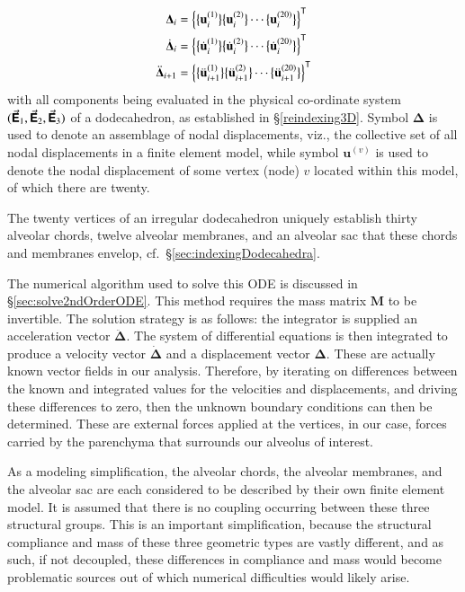\begin{subequations}
\begin{align}
    \boldsymbol{\Delta}_i & = \Bigl\{ 
    \bigl\{ \mathbf{u}^{(1)}_i \bigr\} 
    \bigl\{ \mathbf{u}^{(2)}_i \bigr\} 
    \cdots
    \bigl\{ \mathbf{u}^{(20)}_i \bigr\}
    \Bigr\}^{\mathsf{T}} \\
    \dot{\boldsymbol{\Delta}}_i & = \Bigl\{ 
    \bigl\{ \dot{\mathbf{u}}^{(1)}_i \bigr\} 
    \bigl\{ \dot{\mathbf{u}}^{(2)}_i \bigr\} 
    \cdots
    \bigl\{ \dot{\mathbf{u}}^{(20)}_i \bigr\}
    \Bigr\}^{\mathsf{T}} \\
    \ddot{\boldsymbol{\Delta}}_{i+1} & = \Bigl\{ 
    \bigl\{ \ddot{\mathbf{u}}\mbox{}^{(1)}_{i+1} \bigr\} 
    \bigl\{ \ddot{\mathbf{u}}\mbox{}^{(2)}_{i+1} \bigr\} 
    \cdots
    \bigl\{ \ddot{\mathbf{u}}\mbox{}^{(20)}_{i+1} \bigr\}
    \Bigr\}^{\mathsf{T}} 
    \end{align}
\end{subequations}
with all components being evaluated in the physical co-ordinate system $( \vec{\boldsymbol{\mathsf{E}}}_1 , \vec{\boldsymbol{\mathsf{E}}}_2 , \vec{\boldsymbol{\mathsf{E}}}_3 )$ of a dodecahedron, as established in \S\ref{reindexing3D}.  Symbol $\boldsymbol{\Delta}$ is used to denote an assemblage of nodal displacements, viz., the collective set of all nodal displacements in a finite element model, while symbol $\mathbf{u}^{(v)}$ is used to denote the nodal displacement of some vertex (node) $v$ located within this model, of which there are twenty.

The twenty vertices of an irregular dodecahedron uniquely establish thirty alveolar chords, twelve alveolar membranes, and an alveolar sac that these chords and membranes envelop, cf.\ \S\ref{sec:indexingDodecahedra}.

The numerical algorithm used to solve this ODE is discussed in \S\ref{sec:solve2ndOrderODE}.  This method requires the mass matrix $\mathbf{M}$ to be invertible.  The solution strategy is as follows: the integrator is supplied an acceleration vector $\ddot{\boldsymbol{\Delta}}$.  The system of differential equations is then integrated to produce a velocity vector $\dot{\boldsymbol{\Delta}}$ and a displacement vector $\boldsymbol{\Delta}$.  These are actually known vector fields in our analysis. Therefore, by iterating on differences between the known and integrated values for the velocities and displacements, and driving these differences to zero, then the unknown boundary conditions can then be determined.  These are external forces applied at the vertices, in our case, forces carried by the parenchyma that surrounds our alveolus of interest.

As a modeling simplification, the alveolar chords, the alveolar membranes, and the alveolar sac are each considered to be described by their own finite element model.  It is assumed that there is no coupling occurring between these three structural groups.  This is an important simplification, because the structural compliance and mass of these three geometric types are vastly different, and as such, if not decoupled, these differences in compliance and mass would become problematic sources out of which numerical difficulties would likely arise.

